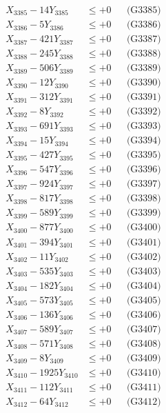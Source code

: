 \documentclass[a4paper,10pt]{article}
\begin{document}
{\begin{align}
X_{3385} - 14Y_{3385} &\leq +0 && \text{(G3385)} \\
X_{3386} - 5Y_{3386} &\leq +0 && \text{(G3386)} \\
X_{3387} - 421Y_{3387} &\leq +0 && \text{(G3387)} \\
X_{3388} - 245Y_{3388} &\leq +0 && \text{(G3388)} \\
X_{3389} - 506Y_{3389} &\leq +0 && \text{(G3389)} \\
X_{3390} - 12Y_{3390} &\leq +0 && \text{(G3390)} \\
\allowbreak
X_{3391} - 312Y_{3391} &\leq +0 && \text{(G3391)} \\
X_{3392} - 8Y_{3392} &\leq +0 && \text{(G3392)} \\
X_{3393} - 691Y_{3393} &\leq +0 && \text{(G3393)} \\
X_{3394} - 15Y_{3394} &\leq +0 && \text{(G3394)} \\
X_{3395} - 427Y_{3395} &\leq +0 && \text{(G3395)} \\
X_{3396} - 547Y_{3396} &\leq +0 && \text{(G3396)} \\
X_{3397} - 924Y_{3397} &\leq +0 && \text{(G3397)} \\
X_{3398} - 817Y_{3398} &\leq +0 && \text{(G3398)} \\
X_{3399} - 589Y_{3399} &\leq +0 && \text{(G3399)} \\
X_{3400} - 877Y_{3400} &\leq +0 && \text{(G3400)} \\
\allowbreak
X_{3401} - 394Y_{3401} &\leq +0 && \text{(G3401)} \\
X_{3402} - 11Y_{3402} &\leq +0 && \text{(G3402)} \\
X_{3403} - 535Y_{3403} &\leq +0 && \text{(G3403)} \\
X_{3404} - 182Y_{3404} &\leq +0 && \text{(G3404)} \\
X_{3405} - 573Y_{3405} &\leq +0 && \text{(G3405)} \\
X_{3406} - 136Y_{3406} &\leq +0 && \text{(G3406)} \\
X_{3407} - 589Y_{3407} &\leq +0 && \text{(G3407)} \\
X_{3408} - 571Y_{3408} &\leq +0 && \text{(G3408)} \\
X_{3409} - 8Y_{3409} &\leq +0 && \text{(G3409)} \\
X_{3410} - 1925Y_{3410} &\leq +0 && \text{(G3410)} \\
\allowbreak
X_{3411} - 112Y_{3411} &\leq +0 && \text{(G3411)} \\
X_{3412} - 64Y_{3412} &\leq +0 && \text{(G3412)} \\

\end{align}}
\end{document}
